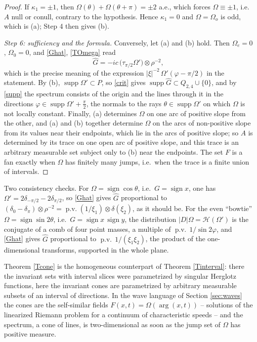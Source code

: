 \documentclass{article}
\newcommand{\tmop}[1]{\ensuremath{\operatorname{#1}}}
\newcommand{\pv}{\operatorname{p.v.}}
\begin{document}
\begin{proof}
		If $\kappa_1=\pm1$, then $\Omega(\theta)+\Omega(\theta+\pi)=\pm2$ a.e., which forces $\Omega\equiv\pm1$, i.e.\ $A$ null or conull, contrary to the hypothesis. Hence $\kappa_1=0$ and $\Omega=\Omega_o$ is odd, which is (a); Step 4 then gives (b).

		\emph{Step 6: sufficiency and the formula.} Conversely, let (a) and (b) hold. Then $\Omega_e=0$, $\Omega_0=0$, and \eqref{Ghat}, \eqref{TOmega} read
		$$\hat G=-ic\,\big(\tau_{\pi/2}\Omega'\big)\otimes\rho^{-2},$$
		which is the precise meaning of the expression $|\xi|^{-2}\,\Omega'(\varphi-\pi/2)$ in the statement. By (b), $\tmop{supp}\Omega'\subset P$, so \eqref{crit} gives $\tmop{supp}\hat G\subset Q_{2,4}\cup\{0\}$, and by \eqref{supp} the spectrum consists of the origin and the lines through it in the directions $\varphi\in\tmop{supp}\Omega'+\frac\pi2$, the normals to the rays $\theta\in\tmop{supp}\Omega'$ on which $\Omega$ is not locally constant. Finally, (a) determines $\Omega$ on one arc of positive slope from the other, and (a) and (b) together determine $\Omega$ on the arcs of non-positive slope from its values near their endpoints, which lie in the arcs of positive slope; so $A$ is determined by its trace on one open arc of positive slope, and this trace is an arbitrary measurable set subject only to (b) near the endpoints. The set $F$ is a fan exactly when $\Omega$ has finitely many jumps, i.e.\ when the trace is a finite union of intervals.
	\end{proof}

	Two consistency checks. For $\Omega=\tmop{sign}\cos\theta$, i.e.\ $G=\tmop{sign}x$, one has $\Omega'=2\delta_{-\pi/2}-2\delta_{\pi/2}$, so \eqref{Ghat} gives $\hat G$ proportional to $(\delta_0-\delta_\pi)\otimes\rho^{-2}=\pv(1/\xi_1)\otimes\delta(\xi_2)$, as it should be. For the even ``bowtie'' $\Omega=\tmop{sign}\sin2\theta$, i.e.\ $G=\tmop{sign}x\,\tmop{sign}y$, the distribution $|D|\Omega=\mathcal H(\Omega')$ is the conjugate of a comb of four point masses, a multiple of $\pv\,1/\sin2\varphi$, and \eqref{Ghat} gives $\hat G$ proportional to $\pv\,1/(\xi_1\xi_2)$, the product of the one-dimensional transforms, supported in the whole plane.

	Theorem \ref{Tcone} is the homogeneous counterpart of Theorem \ref{Tinterval}: there the invariant sets with interval slices were parametrized by singular Herglotz functions, here the invariant cones are parametrized by arbitrary measurable subsets of an interval of directions. In the wave language of Section \ref{sec:waves} the cones are the self-similar fields $F(x,t)=\Omega(\arg(x,t))$ -- solutions of the linearized Riemann problem for a continuum of characteristic speeds -- and the spectrum, a cone of lines, is two-dimensional as soon as the jump set of $\Omega$ has positive measure.
\end{document}
